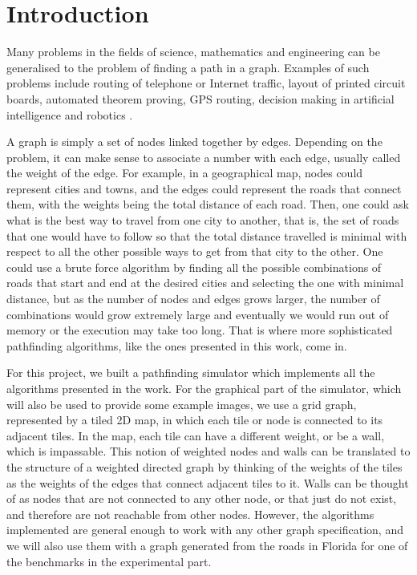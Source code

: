 \documentclass[a4paper,10pt]{report}
\begin{document}
\tableofcontents

\pagestyle{fancy}
\chapter{Introduction}
Many problems in the fields of science, mathematics and engineering can be generalised to the problem of finding a path in a graph. Examples of such problems include routing of telephone or Internet traffic, layout of printed circuit boards, automated theorem proving, GPS routing, decision making in artificial intelligence and robotics \cite{ai}.

A graph is simply a set of nodes linked together by edges. Depending on the problem, it can make sense to associate a number with each edge, usually called the weight of the edge. For example, in a geographical map, nodes could represent cities and towns, and the edges could represent the roads that connect them, with the weights being the total distance of each road. Then, one could ask what is the best way to travel from one city to another, that is, the set of roads that one would have to follow so that the total distance travelled is minimal with respect to all the other possible ways to get from that city to the other. One could use a brute force algorithm by finding all the possible combinations of roads that start and end at the desired cities and selecting the one with minimal distance, but as the number of nodes and edges grows larger, the number of combinations would grow extremely large and eventually we would run out of memory or the execution may take too long. That is where more sophisticated pathfinding algorithms, like the ones presented in this work, come in.

For this project, we built a pathfinding simulator which implements all the algorithms presented in the work. For the graphical part of the simulator, which will also be used to provide some example images, we use a grid graph, represented by a tiled 2D map, in which each tile or node is connected to its adjacent tiles. In the map, each tile can have a different weight, or be a wall, which is impassable. This notion of weighted nodes and walls can be translated to the structure of a weighted directed graph by thinking of the weights of the tiles as the weights of the edges that connect adjacent tiles to it. Walls can be thought of as nodes that are not connected to any other node, or that just do not exist, and therefore are not reachable from other nodes. However, the algorithms implemented are general enough to work with any other graph specification, and we will also use them with a graph generated from the roads in Florida for one of the benchmarks in the experimental part.
\end{document}
